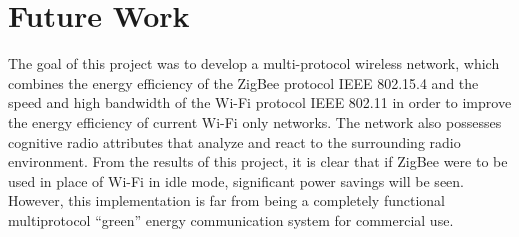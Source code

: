 \documentclass[conference]{IEEEtran}
\begin{document}
\section{Future Work}
The goal of this project was to develop a multi-protocol wireless network, which combines the energy efficiency of the ZigBee protocol IEEE 802.15.4 and the speed and high bandwidth of the Wi-Fi protocol IEEE 802.11 in order to improve the energy efficiency of current Wi-Fi only networks.  The network also possesses cognitive radio attributes that analyze and react to the surrounding radio environment.  From the results of this project, it is clear that if ZigBee were to be used in place of Wi-Fi in idle mode, significant power savings will be seen.  However, this implementation is far from being a completely functional multiprotocol “green” energy communication system for commercial use.



\end{document}
